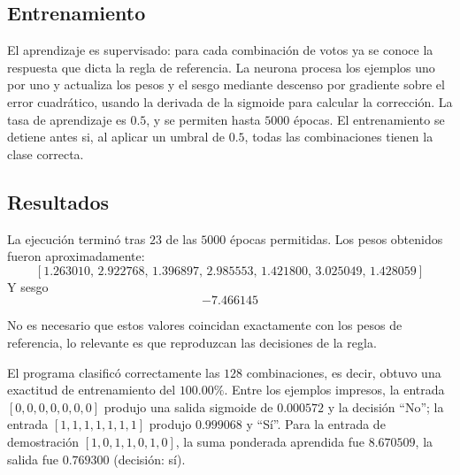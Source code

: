 \documentclass[12pt,a4paper]{article}
\begin{document}
\subsection{Entrenamiento}

El aprendizaje es supervisado: para cada combinación de votos ya se conoce la respuesta que dicta la regla de referencia. La neurona procesa los ejemplos uno por uno y actualiza los pesos y el sesgo mediante descenso por gradiente sobre el error cuadrático, usando la derivada de la sigmoide para calcular la corrección. La tasa de aprendizaje es \(0.5\), y se permiten hasta \(5000\) épocas. El entrenamiento se detiene antes si, al aplicar un umbral de \(0.5\), todas las combinaciones tienen la clase correcta.

\subsection{Resultados}

La ejecución terminó tras \(23\) de las \(5000\) épocas permitidas. Los pesos obtenidos fueron aproximadamente:
$$[1.263010,\,2.922768,\,1.396897,\,2.985553,\,1.421800,\,3.025049,\,1.428059]$$
Y sesgo
$$-7.466145$$

No es necesario que estos valores coincidan exactamente con los pesos de referencia, lo relevante es que reproduzcan las decisiones de la regla.

El programa clasificó correctamente las \(128\) combinaciones, es decir, obtuvo una exactitud de entrenamiento del \(100.00\%\). Entre los ejemplos impresos, la entrada \([0,0,0,0,0,0,0]\) produjo una salida sigmoide de \(0.000572\) y la decisión ``No''; la entrada \([1,1,1,1,1,1,1]\) produjo \(0.999068\) y ``Sí''. Para la entrada de demostración \([1,0,1,1,0,1,0]\), la suma ponderada aprendida fue \(8.670509\), la salida fue \(0.769300\) (decisión: sí).
\end{document}
